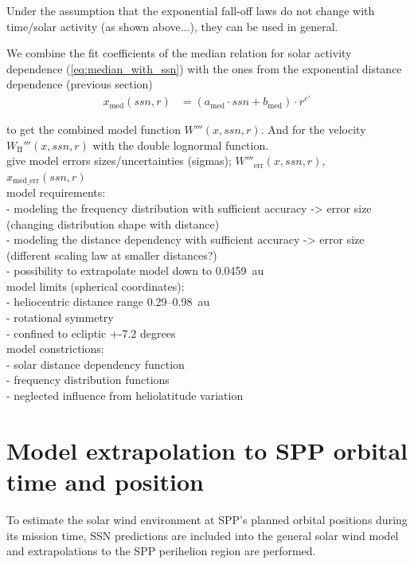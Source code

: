 Under the assumption that the exponential fall-off laws do not change with time/solar activity (as shown above...), they can be used in general.

We combine the fit coefficients of the median relation for solar activity dependence (\ref{eq:median_with_ssn}) with the ones from the exponential distance dependence (previous section)
\begin{align}
	x_\text{med}(ssn,r) &= (a_\text{med} \cdot ssn + b_\text{med}) \cdot r^{e'}
\end{align}

to get the combined model function $W'''(x,ssn,r)$. And for the velocity $W_\text{II}'''(x,ssn,r)$ with the double lognormal function.\\

give model errors sizes/uncertainties (sigmas); $W'''_\text{err}(x,ssn,r)$, $x_\text{med\_err}(ssn,r)$\\

model requirements:\\
- modeling the frequency distribution with sufficient accuracy -> error size (changing distribution shape with distance)\\
- modeling the distance dependency with sufficient accuracy -> error size (different scaling law at smaller distances?)\\
- possibility to extrapolate model down to 0.0459~au\\

model limits (spherical coordinates):\\
- heliocentric distance range 0.29--0.98~au\\
- rotational symmetry\\
- confined to ecliptic +-7.2 degrees\\
model constrictions:\\
- solar distance dependency function\\
- frequency distribution functions\\
- neglected influence from heliolatitude variation\\


\section{Model extrapolation to SPP orbital time and position}
To estimate the solar wind environment at SPP's planned orbital positions during its mission time, SSN predictions are included into the general solar wind model and extrapolations to the SPP perihelion region are performed.\\

